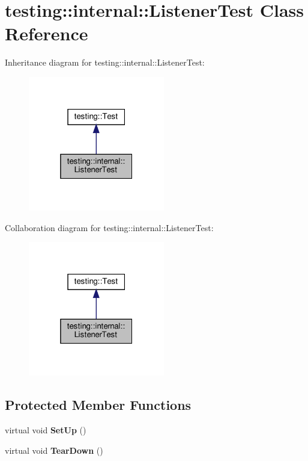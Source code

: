 \hypertarget{classtesting_1_1internal_1_1_listener_test}{}\section{testing\+:\+:internal\+:\+:Listener\+Test Class Reference}
\label{classtesting_1_1internal_1_1_listener_test}


Inheritance diagram for testing\+:\+:internal\+:\+:Listener\+Test\+:
\nopagebreak
\begin{figure}[H]
\begin{center}
\leavevmode
\includegraphics[width=169pt]{classtesting_1_1internal_1_1_listener_test__inherit__graph}
\end{center}
\end{figure}


Collaboration diagram for testing\+:\+:internal\+:\+:Listener\+Test\+:
\nopagebreak
\begin{figure}[H]
\begin{center}
\leavevmode
\includegraphics[width=169pt]{classtesting_1_1internal_1_1_listener_test__coll__graph}
\end{center}
\end{figure}
\subsection*{Protected Member Functions}
\begin{DoxyCompactItemize}
\item 
\mbox{\label{classtesting_1_1internal_1_1_listener_test_ace3dbe36b705ddf320518e6cdd919bc8}} 
virtual void {\bfseries Set\+Up} ()
\item 
\mbox{\label{classtesting_1_1internal_1_1_listener_test_ad112535025d668e3ea14e71d8741c810}} 
virtual void {\bfseries Tear\+Down} ()
\end{DoxyCompactItemize}
